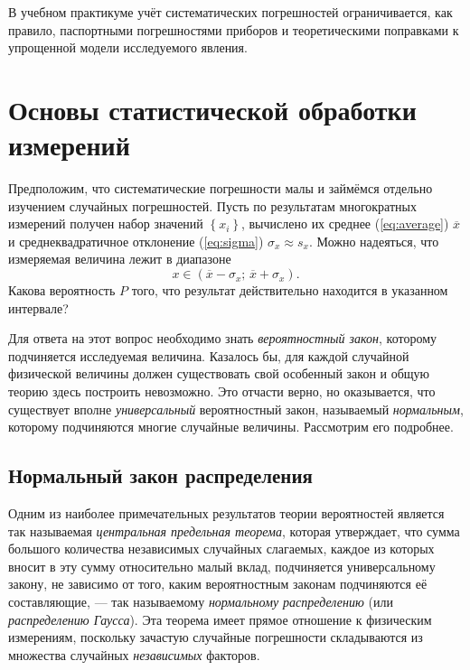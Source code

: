 \documentclass[10pt]{article}
\begin{document}
В учебном практикуме учёт систематических погрешностей ограничивается,
как правило, паспортными погрешностями приборов и теоретическими поправками
к упрощенной модели исследуемого явления.

\section{Основы статистической обработки измерений}


Предположим, что систематические погрешности малы и займёмся отдельно
изучением случайных погрешностей. Пусть по результатам многократных
измерений получен набор значений $\left\{ x_{i}\right\} $, вычислено
их среднее (\ref{eq:average}) $\overline{x}$ и среднеквадратичное
отклонение (\ref{eq:sigma}) $\sigma_{x}\approx s{}_{x}$. Можно надеяться,
что измеряемая величина лежит в диапазоне
\[
x\in\left(\overline{x}-\sigma_{x};\,\overline{x}+\sigma_{x}\right).
\]
Какова вероятность $P$ того, что результат действительно находится
в указанном интервале?

Для ответа на этот вопрос необходимо знать \emph{вероятностный закон},
которому подчиняется исследуемая величина. Казалось бы, для каждой
случайной физической величины должен существовать свой особенный закон
и общую теорию здесь построить невозможно. Это отчасти верно, но оказывается,
что существует вполне \emph{универсальный} вероятностный закон, называемый
\emph{нормальным}, которому подчиняются многие случайные величины.
Рассмотрим его подробнее.

\subsection{Нормальный закон распределения}


Одним из наиболее примечательных результатов теории вероятностей является
так называемая \emph{центральная предельная теорема}, которая утверждает,
что сумма большого количества независимых случайных слагаемых, каждое
из которых вносит в эту сумму относительно малый вклад, подчиняется
универсальному закону, не зависимо от того, каким вероятностным законам
подчиняются её составляющие, --- так называемому \emph{нормальному
распределению} (или \emph{распределению Гаусса}). Эта теорема имеет
прямое отношение к физическим измерениям, поскольку зачастую случайные
погрешности складываются из множества случайных \emph{независимых}
факторов.
\end{document}
